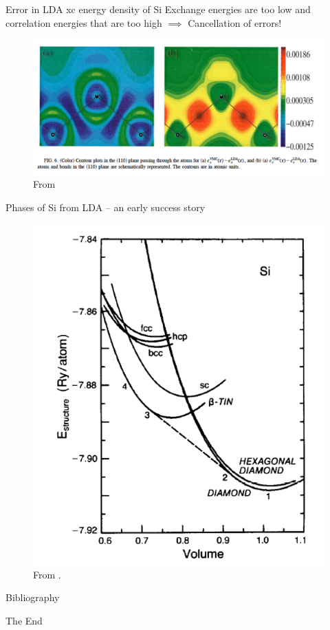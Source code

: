 \documentclass[aspectratio=169]{beamer}
\begin{document}
\begin{frame}{Error in LDA xc energy density of Si}
Exchange energies are too low and correlation energies that are too high $\implies$ Cancellation of errors!
\begin{figure}
    \centering
    \includegraphics[width=0.7\linewidth]{lectures/figures/5_xc_energies_Si.png}
    \caption{From \cite{hoodExchangeCorrelationSilicon1998}}
\end{figure}

\end{frame} 

\begin{frame}{Phases of Si from LDA – an early success story}
\begin{figure}
    \centering
    \includegraphics[width=0.35\linewidth]{lectures/figures/5_phase_diagram_si.png}
    \caption{From \cite{yinTheoryStaticStructural1982}.}
    \label{fig:enter-label}
\end{figure}
\end{frame} 

\begin{frame}[allowframebreaks]{Bibliography}
    
    
\end{frame}

\begin{frame}
    \Huge{\centerline{The End}}
\end{frame}
\end{document}
